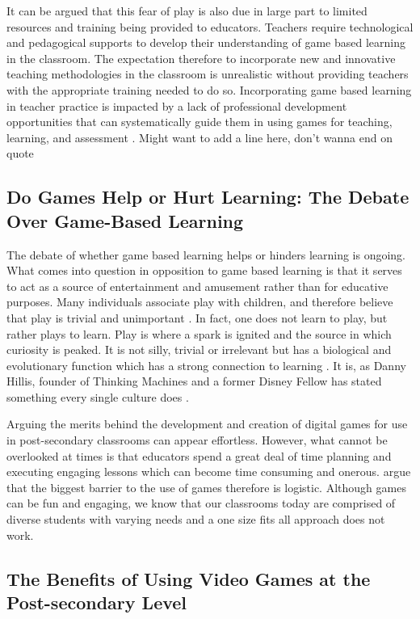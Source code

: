 \documentclass{article}
\begin{document}
It can be argued that this fear of play is also due in large part to limited resources and training being provided to educators. Teachers require technological and pedagogical supports to develop their understanding of game based learning in the classroom. The expectation therefore to incorporate new and innovative teaching methodologies in the classroom is unrealistic without providing teachers with the appropriate training needed to do so. Incorporating game based learning in teacher practice is impacted by a lack of professional development opportunities that can systematically guide them in using games for teaching, learning, and assessment \citep{fishman2014empowering,ruggiero2013video,foster2020principles}. Might want to add a line here, don’t wanna end on quote


\subsection{Do Games Help or Hurt Learning: The Debate Over Game-Based Learning}

The debate of whether game based learning helps or hinders learning is ongoing. What comes into question in opposition to game based learning is that it serves to act as a source of entertainment and amusement rather than for educative purposes. Many individuals associate play with children, and therefore believe that play is trivial and unimportant \citep{prensky2001fun}. In fact, one does not learn to play, but rather plays to learn. Play is where a spark is ignited and the source in which curiosity is peaked. It is not silly, trivial or irrelevant but has a biological and evolutionary function which has a strong connection to learning \citep{prensky2001fun}. It is, as Danny Hillis, founder of Thinking Machines and a former Disney Fellow has stated something every single culture does \citep{prensky2001fun}.

Arguing the merits behind the development and creation of digital games for use in post-secondary classrooms can appear effortless. However, what cannot be overlooked at times is that educators spend a great deal of time planning and executing engaging lessons which can become time consuming and onerous. \citet{mckeachie2013mckeachie} argue that the biggest barrier to the use of games therefore is logistic. Although games can be fun and engaging, we know that our classrooms today are comprised of diverse students with varying needs and a one size fits all approach does not work.

\subsection{The Benefits of Using Video Games at the Post-secondary Level}
\end{document}

